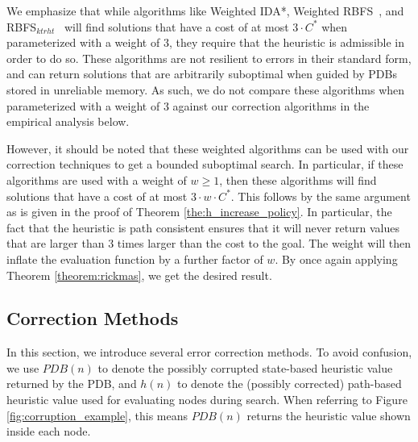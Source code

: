 \documentclass[letterpaper]{article}
\begin{document}
We emphasize that while algorithms like Weighted IDA*, Weighted RBFS~\cite{Korf1992}, and RBFS$_{ktrht}$~\cite{hatem2015recursive} will find solutions that have a cost of at most $3 \cdot C^*$ when parameterized with a weight of $3$, they require that the heuristic is admissible in order to do so. These algorithms are not resilient to errors in their standard form, and can return solutions that are arbitrarily suboptimal when guided by PDBs stored in unreliable memory. As such, we do not compare these algorithms when parameterized with a weight of $3$ against our correction algorithms in the empirical analysis below.

However, it should be noted that these weighted algorithms can be used with our correction techniques to get a bounded suboptimal search. In particular, if these algorithms are used with a weight of $w \geq 1$, then these algorithms will find solutions that have a cost of at most  $3 \cdot w \cdot C^*$. This follows by the same argument as is given in the proof of Theorem \ref{the:h_increase_policy}. In particular, the fact that the heuristic is path consistent ensures that it will never return values that are larger than $3$ times larger than the cost to the goal. The weight will then inflate the evaluation function by a further factor of $w$. By once again applying Theorem \ref{theorem:rickmas}, we get the desired result.









\subsection{Correction Methods}







In this section, we introduce several error correction methods.
To avoid confusion, we use $PDB(n)$ to denote the possibly corrupted state-based heuristic value returned by the PDB, and $h(n)$ to denote the (possibly corrected) path-based heuristic value used for evaluating nodes during search.
When referring to Figure \ref{fig:corruption_example}, this means $PDB(n)$ returns the heuristic value shown inside each node.
\end{document}
